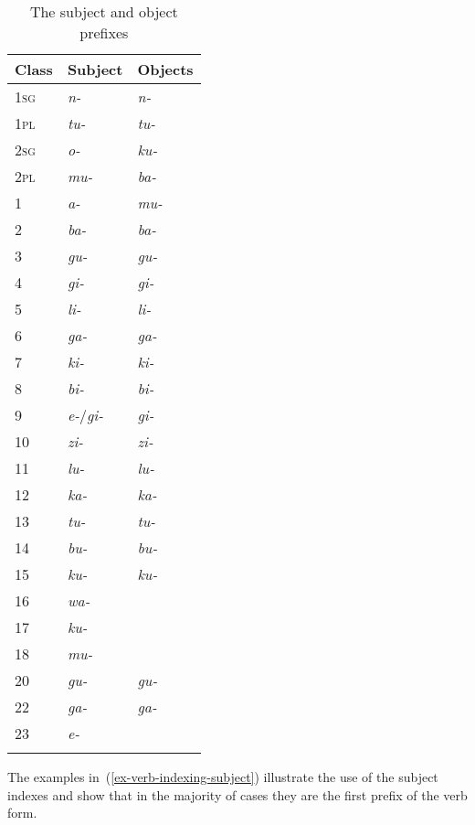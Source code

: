 \begin{table}
\caption{The subject and object prefixes}
\label{tab-verb-indexes}
	\begin{tabular}{lll}
\lsptoprule
Class & Subject & Objects\\
\midrule
1\textsc{sg} & \textit{n-} & \textit{n-}\\
1\textsc{pl} & \textit{tu-} & \textit{tu-}\\
2\textsc{sg} & \textit{o-} & \textit{ku-}\\
2\textsc{pl} & \textit{mu-} & \textit{ba-}\\
1 & \textit{a-} & \textit{mu-}\\
2 & \textit{ba-} & \textit{ba-}\\
3 & \textit{gu-} & \textit{gu-}\\
4 & \textit{gi-} & \textit{gi-}\\
5 & \textit{li-} & \textit{li-}\\
6 & \textit{ga-} & \textit{ga-}\\
7 & \textit{ki-} & \textit{ki-}\\
8 & \textit{bi-} & \textit{bi-}\\
9 & \textit{e-}/\textit{gi-}& \textit{gi-}\\
10 & \textit{zi-} & \textit{zi-}\\
11 & \textit{lu-} & \textit{lu-}\\
12 & \textit{ka-} & \textit{ka-}\\
13 & \textit{tu-} & \textit{tu-}\\
14 & \textit{bu-} & \textit{bu-}\\
15 & \textit{ku-} & \textit{ku-}\\
16 & \textit{wa-} &\\
17 & \textit{ku-} &\\
18 & \textit{mu-} &\\
20 & \textit{gu-} & \textit{gu-}\\
22 & \textit{ga-} & \textit{ga-}\\
23 & \textit{e-} &\\
\lspbottomrule
	\end{tabular}
\end{table}

The examples in~(\ref{ex-verb-indexing-subject}) illustrate the use of the subject indexes and show that in the majority of cases they are the first prefix of the verb form.

